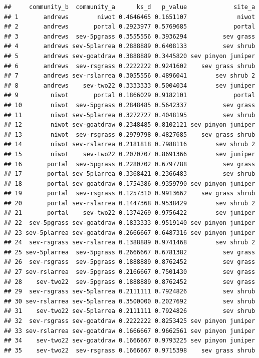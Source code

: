 \documentclass[]{article}
\begin{document}
\begin{verbatim}
##     community_b  community_a      ks_d   p_value             site_a
## 1       andrews        niwot 0.4646465 0.1651107              niwot
## 2       andrews       portal 0.2923977 0.5769685             portal
## 3       andrews  sev-5pgrass 0.3555556 0.3936294          sev grass
## 4       andrews sev-5plarrea 0.2888889 0.6408133          sev shrub
## 5       andrews sev-goatdraw 0.3888889 0.3445820 sev pinyon juniper
## 6       andrews  sev-rsgrass 0.2222222 0.9241602    sev grass shrub
## 7       andrews sev-rslarrea 0.3055556 0.4896041        sev shrub 2
## 8       andrews    sev-two22 0.3333333 0.5004034        sev juniper
## 9         niwot       portal 0.1866029 0.9182101             portal
## 10        niwot  sev-5pgrass 0.2848485 0.5642337          sev grass
## 11        niwot sev-5plarrea 0.3272727 0.4048195          sev shrub
## 12        niwot sev-goatdraw 0.2348485 0.8102121 sev pinyon juniper
## 13        niwot  sev-rsgrass 0.2979798 0.4827685    sev grass shrub
## 14        niwot sev-rslarrea 0.2181818 0.7988116        sev shrub 2
## 15        niwot    sev-two22 0.2070707 0.8691366        sev juniper
## 16       portal  sev-5pgrass 0.2280702 0.6797788          sev grass
## 17       portal sev-5plarrea 0.3368421 0.2366483          sev shrub
## 18       portal sev-goatdraw 0.1754386 0.9359790 sev pinyon juniper
## 19       portal  sev-rsgrass 0.1257310 0.9913662    sev grass shrub
## 20       portal sev-rslarrea 0.1447368 0.9538429        sev shrub 2
## 21       portal    sev-two22 0.1374269 0.9756422        sev juniper
## 22  sev-5pgrass sev-goatdraw 0.1833333 0.9519140 sev pinyon juniper
## 23 sev-5plarrea sev-goatdraw 0.2666667 0.6487316 sev pinyon juniper
## 24  sev-rsgrass sev-rslarrea 0.1388889 0.9741468        sev shrub 2
## 25 sev-5plarrea  sev-5pgrass 0.2666667 0.6781382          sev grass
## 26  sev-rsgrass  sev-5pgrass 0.1888889 0.8762452          sev grass
## 27 sev-rslarrea  sev-5pgrass 0.2166667 0.7501430          sev grass
## 28    sev-two22  sev-5pgrass 0.1888889 0.8762452          sev grass
## 29  sev-rsgrass sev-5plarrea 0.2111111 0.7924826          sev shrub
## 30 sev-rslarrea sev-5plarrea 0.3500000 0.2027692          sev shrub
## 31    sev-two22 sev-5plarrea 0.2111111 0.7924826          sev shrub
## 32  sev-rsgrass sev-goatdraw 0.2222222 0.8253425 sev pinyon juniper
## 33 sev-rslarrea sev-goatdraw 0.1666667 0.9662561 sev pinyon juniper
## 34    sev-two22 sev-goatdraw 0.1666667 0.9793225 sev pinyon juniper
## 35    sev-two22  sev-rsgrass 0.1666667 0.9715398    sev grass shrub

\end{verbatim}
\end{document}
